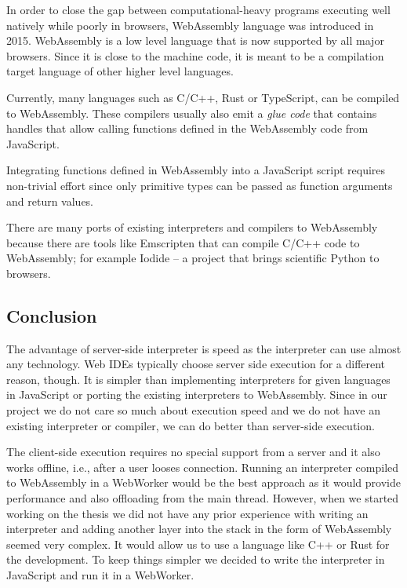 In order to close the gap between computational-heavy programs executing well natively while poorly in browsers, WebAssembly
language was introduced in 2015. WebAssembly is a low level language that is now supported by all major browsers. Since it is
close to the machine code, it is meant to be a compilation target language of other higher level languages.

Currently, many languages such as C/C++, Rust or TypeScript, can be compiled to WebAssembly. These compilers usually also emit
a \emph{glue code} that contains handles that allow calling functions defined in the WebAssembly code from JavaScript.

Integrating functions defined in WebAssembly into a JavaScript script requires non-trivial effort since only primitive types can be passed
as function arguments and return values.

There are many ports of existing interpreters and compilers to WebAssembly because there are tools like Emscripten \cite{Emscripten}
that can compile C/C++ code to WebAssembly; for example Iodide \cite{Iodide} -- a project that brings scientific Python
to browsers.

\subsection{Conclusion}
The advantage of server-side interpreter is speed as the interpreter can use almost any technology. Web IDEs typically choose
server side execution for a different reason, though. It is simpler than implementing interpreters for given languages in JavaScript or
porting the existing interpreters to WebAssembly. Since in our project we do not care so much about execution speed and
we do not have an existing interpreter or compiler, we can do better than server-side execution.

The client-side execution requires no special support from a server and it also works offline, i.e., after a user looses connection. Running an interpreter
compiled to WebAssembly in a WebWorker would be the best approach as it would provide performance and also offloading from the main thread.
However, when we started working on the thesis we did not have any prior experience with writing an interpreter and adding another layer into the stack in the
form of WebAssembly seemed very complex. It would allow us to use a language like C++ or Rust for the development. To keep things simpler we
decided to write the interpreter in JavaScript and run it in a WebWorker.

